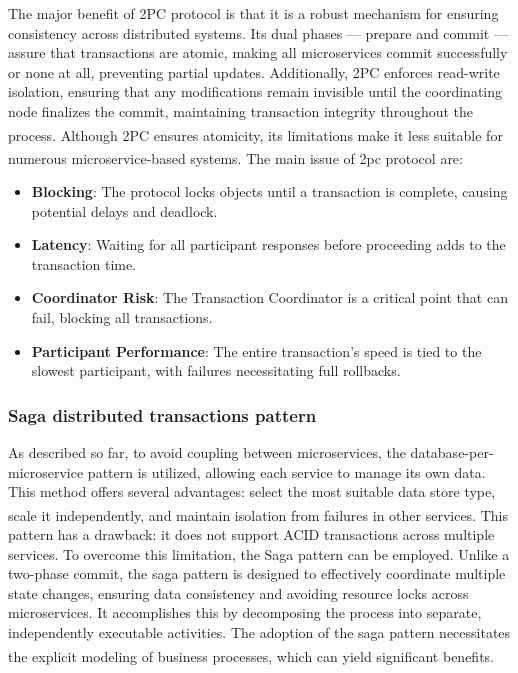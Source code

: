 The major benefit of 2PC protocol is that it is a robust mechanism for ensuring consistency across
distributed systems. Its dual phases — prepare and commit — assure that transactions are atomic,
making all microservices commit successfully or none at all, preventing partial updates.
Additionally, 2PC enforces read-write isolation, ensuring that any modifications remain invisible
until the coordinating node finalizes the commit, maintaining transaction integrity throughout the
process\textsuperscript{\cite{2pc_2}}.
\newline\newline
Although 2PC ensures atomicity, its limitations make it less suitable for numerous
microservice-based systems\textsuperscript{\cite{2pc_2}}. The main issue of 2pc protocol
are\textsuperscript{\cite{2pc_3}}:

\begin{itemize}
    \item \textbf{Blocking}: The protocol locks objects until a transaction is complete, causing
          potential delays and deadlock.
    \item \textbf{Latency}: Waiting for all participant responses before proceeding adds to the
          transaction time.
    \item \textbf{Coordinator Risk}: The Transaction Coordinator is a critical point that can fail,
          blocking all transactions.
    \item \textbf{Participant Performance}: The entire transaction's speed is tied to the slowest
          participant, with failures necessitating full rollbacks.
\end{itemize}

\subsubsection{Saga distributed transactions pattern}
As described so far, to avoid coupling between microservices, the database-per-microservice pattern
is utilized, allowing each service to manage its own data. This method offers several advantages:
select the most suitable data store type, scale it independently, and maintain isolation from
failures in other services\textsuperscript{\cite{ms_sagas}}. This pattern has a drawback: it does
not support ACID transactions across multiple services. To overcome this limitation, the Saga
pattern can be employed.
\newline\newline
Unlike a two-phase commit, the saga pattern is designed to effectively coordinate multiple state
changes, ensuring data consistency and avoiding resource locks across microservices. It accomplishes
this by decomposing the process into separate, independently executable activities. The adoption of
the saga pattern necessitates the explicit modeling of business processes, which can yield
significant benefits\textsuperscript{\cite{microservices_book}}.

